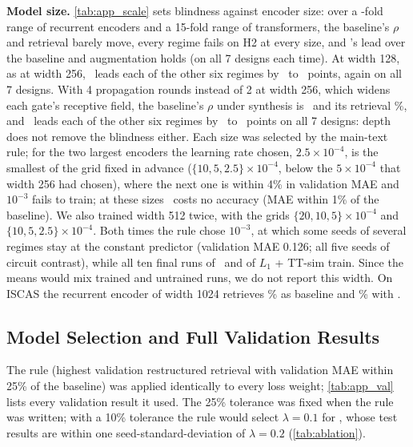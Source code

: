 \begin{table}[h]
\centering\scriptsize
\caption{Encoder size against blindness and repair (EPFL test, 5 seeds each). Recurrent: restructured pairs; transformer:
all proven pairs. $\rho_{\text{H2}}$: range over baseline, augmentation and \ours.}
\label{tab:app_scale}
\resizebox{\columnwidth}{!}{}
\end{table}
\noindent\textbf{Model size.} \cref{tab:app_scale} sets blindness against encoder size: over a \ScFold-fold range of recurrent
encoders and a 15-fold range of transformers, the baseline's $\rho$ and retrieval barely move, every regime fails on H2 at
every size, and \ours's lead over the baseline and augmentation holds (on all 7 designs each time). At width 128, as at width 256, \ours\ leads each of the other six regimes by \ScOneTwoEightMin\ to \ScOneTwoEightMax\ points, again on all 7 designs. With 4 propagation rounds instead of 2 at width 256, which widens each gate's receptive field, the baseline's $\rho$ under synthesis is \ScDeepBaseRho\ and its retrieval \ScDeepBaseTop\%, and \ours\ leads each of the other six regimes by \ScDeepLeadMin\ to \ScDeepLeadMax\ points on all 7 designs: depth does not remove the blindness either. Each size was selected by
the main-text rule; for the two largest encoders the learning rate chosen, $2.5\!\times\!10^{-4}$, is the smallest of the grid
fixed in advance ($\{10,5,2.5\}\!\times\!10^{-4}$, below the $5\!\times\!10^{-4}$ that width 256 had chosen), where the next one
is within 4\% in validation MAE and $10^{-3}$ fails to train; at these sizes \ours\ costs no accuracy (MAE within 1\% of the
baseline). We also trained width 512 twice, with the grids $\{20,10,5\}\!\times\!10^{-4}$ and $\{10,5,2.5\}\!\times\!10^{-4}$. Both times the rule chose $10^{-3}$, at which some seeds of several regimes stay at the constant predictor (validation MAE 0.126; all five seeds of circuit contrast), while all ten final runs of \ours\ and of $L_1$ + TT-sim train. Since the means would mix trained and untrained runs, we do not report this width. On ISCAS the recurrent encoder of width 1024 retrieves \ScIsBase\% as baseline and \ScIsOurs\% with \ours.

\FloatBarrier
\subsection{Model Selection and Full Validation Results}\label{app:selection}

\noindent The rule (highest validation restructured retrieval with validation MAE within 25\% of the baseline)
was applied identically to every loss weight; \cref{tab:app_val} lists every validation result it used. The 25\%
tolerance was fixed when the rule was written; with a 10\% tolerance the rule would select $\lambda=0.1$ for \ours,
whose test results are within one seed-standard-deviation of $\lambda=0.2$ (\cref{tab:ablation}).

